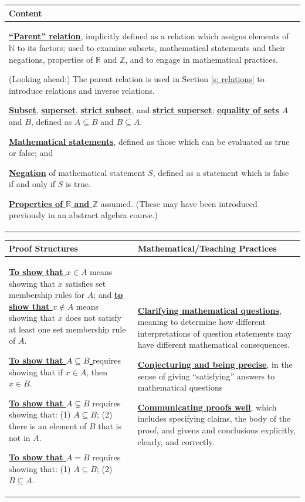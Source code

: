 \documentclass[11pt]{article}
\newcommand{\R}{\mathbb{R}}
\newcommand{\N}{\mathbb{N}}
\newcommand{\Z}{\mathbb{Z}}
\renewcommand\subset\subseteq
\renewcommand\emph[1]{\underline{\bf{#1}}} %
\theoremstyle{definition}
\begin{document}
 \vspace*{-16pt}
\begin{tabular}{L{6.5in}} 
{\bf Content} \\ \hline \parskip4pt
\emph{``Parent'' relation}, implicitly defined as a relation which assigns elements of $\N$ to its factors; used to examine subsets, mathematical statements and their negations, properties of $\R$ and $\Z$, and to engage in mathematical practices. 

(Looking ahead:) The parent relation is used in Section \ref{s: relations} to introduce relations and inverse relations.

\emph{Subset}, \emph{superset}, \emph{strict subset}, and \emph{strict superset}; \emph{equality of sets} $A$ and $B$, defined as $A\subset B$ and $B\subset A$.

\emph{Mathematical statements}, defined as those which can be evaluated as true or false; and 

\emph{Negation} of mathematical statement $S$, defined as a statement which is false if and only if $S$ is true.

\emph{Properties of $\R$ and $\Z$} assumed. (These may have been introduced previously in an abstract algebra course.)
\end{tabular}

\begin{tabular}{L{3.2in}|L{3.2in}}
{\bf Proof Structures} & {\bf Mathematical/Teaching Practices} \\ 
\hline \parskip4pt
\emph{To show that $x\in A$} means showing that $x$ satisfies set membership rules for $A$; and \emph{to show that $x\notin A$} means showing that $x$ does not satisfy at least one set membership rule of $A$.

\emph{To show that $A\subset B$ }requires showing that if $x\in A$, then $x\in B$.

\emph{To show that $A\subsetneq B$} requires showing that: (1) $A\subset B$; (2) there is an element of $B$ that is not in $A$.

\emph{To show that $A=B$} requires showing that: (1) $A\subset B$; (2) $B\subset A$.
&
\parskip6pt
\emph{Clarifying mathematical questions}, meaning to determine how different interpretations of question statements may have different mathematical consequences.
 
\emph{Conjecturing and being precise}, in the sense of giving ``satisfying'' answers to mathematical questions

\emph{Communicating proofs well}, which includes specifying claims, the body of the proof, and givens and conclusions explicitly, clearly, and correctly.
\end{tabular}
\end{document}
